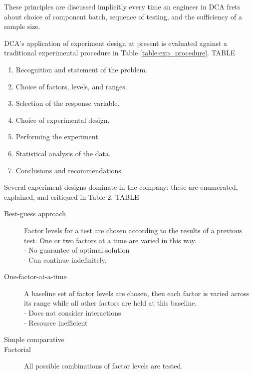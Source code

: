 \documentclass[11pt,a4paper,article]{memoir} %
\begin{document}
These principles are discussed implicitly every time an engineer in DCA frets about choice of component batch, sequence of testing, and the sufficiency of a sample size. 
\par
DCA's application of experiment design at present is evaluated against a traditional experimental procedure in Table \ref{table:exp_procedure}.
TABLE
\begin{enumerate}
\item Recognition and statement of the problem.
\item Choice of factors, levels, and ranges.
\item Selection of the response variable.
\item Choice of experimental design.
\item Performing the experiment.
\item Statistical analysis of the data.
\item Conclusions and recommendations.
\end{enumerate}
\par
Several experiment designs dominate in the company: these are enumerated, explained, and critiqued in Table 2.
TABLE
\begin{description}
\item[Best-guess approach]{Factor levels for a test are chosen according to the results of a previous test. One or two factors at a time are varied in this way. \\ - No guarantee of optimal solution \\ - Can continue indefinitely.}
\item[One-factor-at-a-time]{A baseline set of factor levels are chosen, then each factor is varied across its range while all other factors are held at this baseline.\\ - Does not consider interactions \\ - Resource inefficient}
\item[Simple comparative]{}
\item[Factorial]{All possible combinations of factor levels are tested.}
\end{description}
\end{document}
